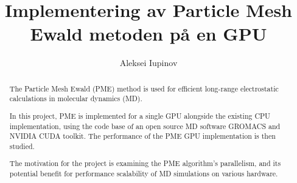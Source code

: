 \documentclass[12pt,a4paper,notitlepage]{report}
\author{Aleksei Iupinov}
\title{Implementering av Particle Mesh Ewald metoden på en GPU}
\date{\vspace{-5ex}}
\begin{document}


\begin{abstract}

The Particle Mesh Ewald (PME) method is used for efficient long-range electrostatic calculations in molecular dynamics (MD).
 
In this project, PME is implemented for a single GPU alongside the existing CPU implementation, using the code base of an open source MD software GROMACS and NVIDIA CUDA toolkit. The performance of the PME GPU implementation is then studied. 

The motivation for the project is examining the PME algorithm's parallelism, and its potential benefit for performance scalability of MD simulations on various hardware. 
\end{abstract}
\newpage

\renewcommand{\abstractname}{Referat}

\iffalse
\end{document}
